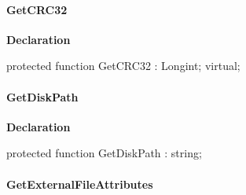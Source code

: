 \documentclass{report}
\newif\ifpdf
\begin{document}
\paragraph*{GetCRC32}\hspace*{\fill}

\label{AbArcTyp.TAbArchiveItem-GetCRC32}
\begin{list}{}{
\setlength{\itemindent}{0cm}
\setlength{\listparindent}{0cm}
\setlength{\leftmargin}{\evensidemargin}
\addtolength{\leftmargin}{\tmplength}
\settowidth{\labelsep}{X}
\addtolength{\leftmargin}{\labelsep}
\setlength{\labelwidth}{\tmplength}
}
\item[\textbf{Declaration}\hfill]
\ifpdf
\begin{flushleft}
\fi
\begin{ttfamily}
protected function GetCRC32 : Longint; virtual;\end{ttfamily}

\ifpdf
\end{flushleft}
\fi

\end{list}
\paragraph*{GetDiskPath}\hspace*{\fill}

\label{AbArcTyp.TAbArchiveItem-GetDiskPath}
\begin{list}{}{
\setlength{\itemindent}{0cm}
\setlength{\listparindent}{0cm}
\setlength{\leftmargin}{\evensidemargin}
\addtolength{\leftmargin}{\tmplength}
\settowidth{\labelsep}{X}
\addtolength{\leftmargin}{\labelsep}
\setlength{\labelwidth}{\tmplength}
}
\item[\textbf{Declaration}\hfill]
\ifpdf
\begin{flushleft}
\fi
\begin{ttfamily}
protected function GetDiskPath : string;\end{ttfamily}

\ifpdf
\end{flushleft}
\fi

\end{list}
\paragraph*{GetExternalFileAttributes}\hspace*{\fill}
\end{document}
